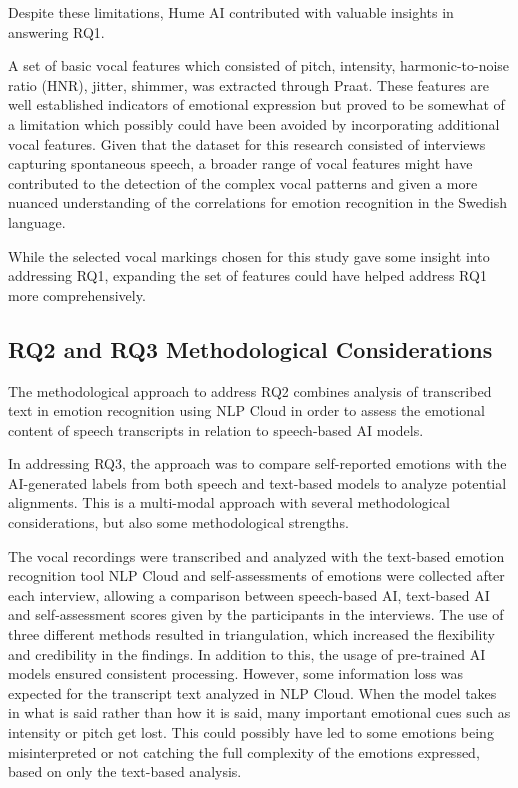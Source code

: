 Despite these limitations, Hume AI contributed with valuable insights in answering RQ1. 

A set of basic vocal features which consisted of pitch, intensity, harmonic-to-noise ratio (HNR), jitter, shimmer, was extracted through Praat. These features are well established indicators of emotional expression but proved to be somewhat of a limitation which possibly could have been avoided by incorporating additional vocal features. Given that the dataset for this research consisted of interviews capturing spontaneous speech, a broader range of vocal features might have contributed to the detection of the complex vocal patterns and given a more nuanced understanding of the correlations for emotion recognition in the Swedish language.

While the selected vocal markings chosen for this study gave some insight into addressing RQ1, expanding the set of features could have helped address RQ1 more comprehensively. 

\subsection{RQ2 and RQ3 Methodological Considerations}
The methodological approach to address RQ2 combines analysis of transcribed text in emotion recognition using NLP Cloud in order to assess the emotional content of speech transcripts in relation to speech-based AI models.

In addressing RQ3, the approach was to compare self-reported emotions with the AI-generated labels from both speech and text-based models to analyze potential alignments.
This is a multi-modal approach with several methodological considerations, but also some methodological strengths.

The vocal recordings were transcribed and analyzed with the text-based emotion recognition tool NLP Cloud and self-assessments of emotions were collected after each interview, allowing a comparison between speech-based AI, text-based AI and self-assessment scores given by the participants in the interviews. 
The use of three different methods resulted in triangulation, which increased the flexibility and credibility in the findings. In addition to this, the usage of pre-trained AI models ensured consistent processing. However, some information loss was expected for the transcript text analyzed in NLP Cloud. When the model takes in what is said rather than how it is said, many important emotional cues such as intensity or pitch get lost. This could possibly have led to some emotions being misinterpreted or not catching the full complexity of the emotions expressed, based on only the text-based analysis.

